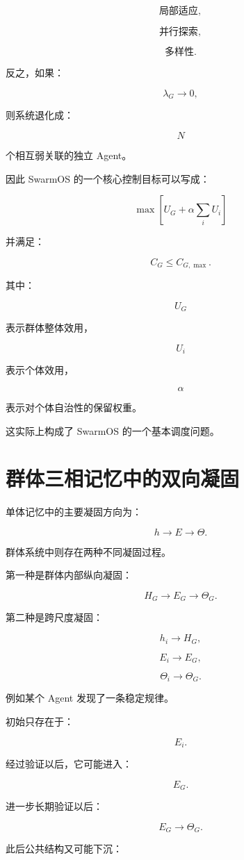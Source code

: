 \[
\text{局部适应},
\]

\[
\text{并行探索},
\]

\[
\text{多样性}.
\]

反之，如果：

\[
\lambda_G
\rightarrow
0,
\]

则系统退化成：

\[
N
\]

个相互弱关联的独立 Agent。

因此 SwarmOS 的一个核心控制目标可以写成：

\[
\max
\left[
U_G
+
\alpha
\sum_iU_i
\right]
\]

并满足：

\[
C_G
\leq
C_{G,\max}.
\]

其中：

\[
U_G
\]

表示群体整体效用，

\[
U_i
\]

表示个体效用，

\[
\alpha
\]

表示对个体自治性的保留权重。

这实际上构成了 SwarmOS 的一个基本调度问题。


\section{群体三相记忆中的双向凝固}

单体记忆中的主要凝固方向为：

\[
h
\rightarrow
E
\rightarrow
\Theta.
\]

群体系统中则存在两种不同凝固过程。

第一种是群体内部纵向凝固：

\[
H_G
\rightarrow
E_G
\rightarrow
\Theta_G.
\]

第二种是跨尺度凝固：

\[
h_i
\rightarrow
H_G,
\]

\[
E_i
\rightarrow
E_G,
\]

\[
\Theta_i
\rightarrow
\Theta_G.
\]

例如某个 Agent 发现了一条稳定规律。

初始只存在于：

\[
E_i.
\]

经过验证以后，它可能进入：

\[
E_G.
\]

进一步长期验证以后：

\[
E_G
\rightarrow
\Theta_G.
\]

此后公共结构又可能下沉：

